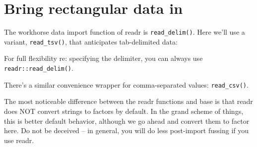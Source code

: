 \documentclass[
]{book}
\newenvironment{Shaded}{\begin{snugshade}}{\end{snugshade}}
\newcommand{\CommentTok}[1]{\textcolor[rgb]{0.56,0.35,0.01}{\textit{#1}}}
\newcommand{\DataTypeTok}[1]{\textcolor[rgb]{0.13,0.29,0.53}{#1}}
\newcommand{\KeywordTok}[1]{\textcolor[rgb]{0.13,0.29,0.53}{\textbf{#1}}}
\newcommand{\NormalTok}[1]{#1}
\newcommand{\OtherTok}[1]{\textcolor[rgb]{0.56,0.35,0.01}{#1}}
\newcommand{\StringTok}[1]{\textcolor[rgb]{0.31,0.60,0.02}{#1}}
\begin{document}
\hypertarget{bring-rectangular-data-in}{%
\section{Bring rectangular data in}\label{bring-rectangular-data-in}}

The workhorse data import function of readr is \texttt{read\_delim()}. Here we'll use a variant, \texttt{read\_tsv()}, that anticipates tab-delimited data:

\begin{Shaded}
\end{Shaded}

For full flexibility re: specifying the delimiter, you can always use \texttt{readr::read\_delim()}.

There's a similar convenience wrapper for comma-separated values: \texttt{read\_csv()}.

The most noticeable difference between the readr functions and base is that readr does NOT convert strings to factors by default. In the grand scheme of things, this is better default behavior, although we go ahead and convert them to factor here. Do not be deceived -- in general, you will do less post-import fussing if you use readr.
\end{document}
